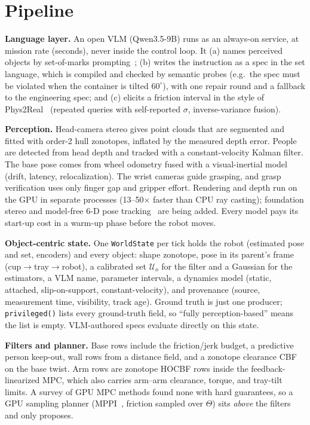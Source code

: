 \documentclass[10pt,twocolumn,letterpaper]{article}
\begin{document}
\section{Pipeline}\label{sec:pipeline}

\textbf{Language layer.} An open VLM (Qwen3.5-9B) runs as an always-on service, at mission rate (seconds), never inside the control loop.
It (a) names perceived objects by set-of-marks prompting~\cite{som}; (b) writes the instruction as a spec in the set language, which is
compiled and checked by semantic probes (e.g.\ the spec must be violated when the container is tilted $60^\circ$), with one repair round
and a fallback to the engineering spec; and (c) elicits a friction interval in the style of Phys2Real~\cite{phys2real} (repeated queries
with self-reported $\sigma$, inverse-variance fusion).

\textbf{Perception.} Head-camera stereo gives point clouds that are segmented and fitted with order-2 hull zonotopes, inflated by the measured
depth error. People are detected from head depth and tracked with a constant-velocity Kalman filter. The base pose comes from wheel odometry
fused with a visual-inertial model (drift, latency, relocalization). The wrist cameras guide grasping, and grasp verification uses only
finger gap and gripper effort. Rendering and depth run on the GPU in separate processes (13--50$\times$ faster than CPU ray casting);
foundation stereo and model-free 6-D pose tracking~\cite{fstereo,fpose} are being added. Every model pays its start-up cost in a warm-up
phase before the robot moves.

\textbf{Object-centric state.} One \texttt{WorldState} per tick holds the robot (estimated pose and set, encoders) and every object:
shape zonotope, pose in its parent's frame (cup$\to$tray$\to$robot), a calibrated set $\mathcal{U}_o$ for the filter and a Gaussian for the
estimators, a VLM name, parameter intervals, a dynamics model (static, attached, slip-on-support, constant-velocity), and provenance
(source, measurement time, visibility, track age). Ground truth is just one producer; \texttt{privileged()} lists every ground-truth field,
so ``fully perception-based'' means the list is empty. VLM-authored specs evaluate directly on this state.

\textbf{Filters and planner.} Base rows include the friction/jerk budget, a predictive person keep-out, wall rows from a distance field,
and a zonotope clearance CBF on the base twist. Arm rows are zonotope HOCBF rows inside the feedback-linearized MPC, which also carries
arm--arm clearance, torque, and tray-tilt limits. A survey of GPU MPC methods found none with hard guarantees, so a GPU sampling planner
(MPPI~\cite{mppi}, friction sampled over $\Theta$) sits \emph{above} the filters and only proposes.
\end{document}
